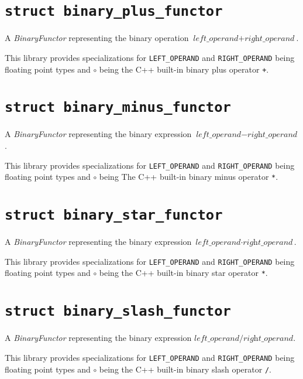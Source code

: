 \documentclass[oneside]{book}
\begin{document}



\section{\texttt{struct binary\_plus\_functor}}
A \textit{BinaryFunctor} representing the binary operation $\textit{left\_operand} + \textit{right\_operand}$.\newline

\noindent{}This library provides specializations for \texttt{LEFT\_OPERAND} and \texttt{RIGHT\_OPERAND} being floating point types
and $\circ$ being the C++ built-in binary plus operator \texttt{+}.

\section{\texttt{struct binary\_minus\_functor}}
A \textit{BinaryFunctor} representing the binary expression $\textit{left\_operand} - \textit{right\_operand}$.\newline

\noindent{}This library provides specializations for \texttt{LEFT\_OPERAND} and \texttt{RIGHT\_OPERAND} being floating point types
and $\circ$ being The C++ built-in binary minus operator \texttt{*}.

\section{\texttt{struct binary\_star\_functor}}
A \textit{BinaryFunctor} representing the binary expression $\textit{left\_operand} \cdot \textit{right\_operand}$.\newline

\noindent{}This library provides specializations for \texttt{LEFT\_OPERAND} and \texttt{RIGHT\_OPERAND} being floating point types
and $\circ$ being the C++ built-in binary star operator \texttt{*}.

\section{\texttt{struct binary\_slash\_functor}}
A \textit{BinaryFunctor} representing the binary expression $\textit{left\_operand} / \textit{right\_operand}$.\newline

\noindent{}This library provides specializations for \texttt{LEFT\_OPERAND} and \texttt{RIGHT\_OPERAND} being floating point types
and $\circ$  being the C++ built-in binary slash operator \texttt{/}.
\end{document}
